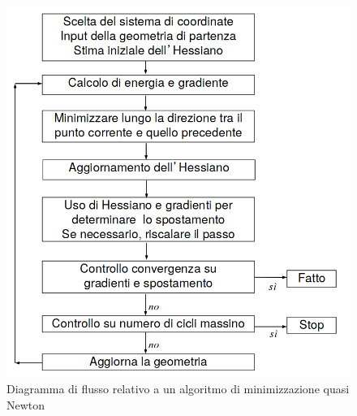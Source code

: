 \documentclass[oneside]{amsbook}
\numberwithin{section}{chapter}
\numberwithin{equation}{section}
\numberwithin{figure}{section}
\begin{document}
\begin{figure}[H]
\label{algo}
\centering
\caption{Diagramma di flusso relativo a un algoritmo di minimizzazione quasi Newton}
\includegraphics[scale=0.3]{quasiNewton}
\end{figure}
\end{document}
